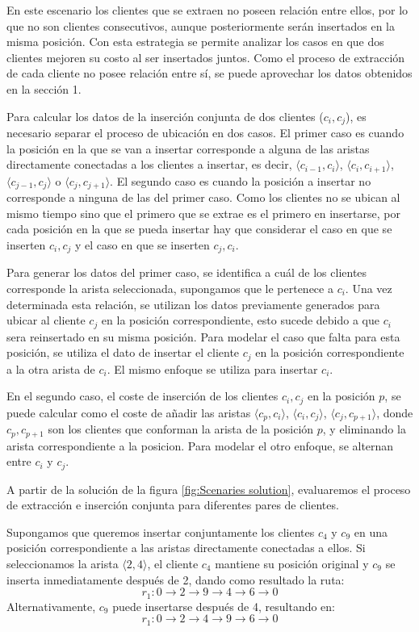 \documentclass{article}
\begin{document}
En este escenario los clientes que se extraen no poseen relación entre ellos, por lo que no son clientes consecutivos, aunque posteriormente serán insertados en la misma posición. Con esta estrategia se permite analizar los casos en que dos clientes mejoren su costo al ser insertados juntos. Como el proceso de extracción de cada cliente no posee relación entre sí, se puede aprovechar los datos obtenidos en la sección 1.

Para calcular los datos de la inserción conjunta de dos clientes ($c_i,c_j$), es necesario separar el proceso de ubicación en dos casos. El primer caso es cuando la posición en la que se van a insertar corresponde a alguna de las aristas directamente conectadas a los clientes a insertar, es decir, $\langle c_{i-1}, c_i \rangle$, $\langle c_i, c_{i+1} \rangle$, $\langle c_{j-1}, c_j \rangle$ o $\langle c_j, c_{j+1} \rangle$. El segundo caso es cuando la posición a insertar no corresponde a ninguna de las del primer caso. Como los clientes no se ubican al mismo tiempo sino que el primero que se extrae es el primero en insertarse, por cada posición en la que se pueda insertar hay que considerar el caso en que se inserten $c_i,c_j$ y el caso en que se inserten $c_j,c_i$. 

Para generar los datos del primer caso, se identifica a cuál de los clientes corresponde la arista seleccionada, supongamos que le pertenece a $c_i$. Una vez determinada esta relación, se utilizan los datos previamente generados para ubicar al cliente $c_j$ en la posición correspondiente, esto sucede debido a que $c_i$ sera reinsertado en su misma posición. Para modelar el caso que falta para esta posición, se utiliza el dato de insertar el cliente $c_j$ en la posición correspondiente a la otra arista de $c_i$. El mismo enfoque se utiliza para insertar $c_i$.

En el segundo caso, el coste de inserción de los clientes $c_i,c_j$ en la posición $p$, se puede calcular como el coste de añadir las aristas $\langle c_p,c_i \rangle$, $\langle c_i,c_j \rangle$, $\langle c_j,c_{p+1} \rangle$, donde $c_p,c_{p+1}$ son los clientes que conforman la arista de la posición $p$, y eliminando la arista correspondiente a la posicion. Para modelar el otro enfoque, se alternan entre $c_i$ y $c_j$.

A partir de la solución de la figura \ref{fig:Scenaries solution}, evaluaremos el proceso de extracción e inserción conjunta para diferentes pares de clientes.  

Supongamos que queremos insertar conjuntamente los clientes  $c_4$ y $c_9$ en una posición correspondiente a las aristas directamente conectadas a ellos. Si seleccionamos la arista $\langle 2, 4 \rangle$, el cliente $c_4$ mantiene su posición original y $c_9$ se inserta inmediatamente después de 2, dando como resultado la ruta:  
\[
r_1: 0 \rightarrow 2 \rightarrow 9 \rightarrow 4 \rightarrow 6 \rightarrow 0
\]  
Alternativamente, $ c_9 $ puede insertarse después de  4, resultando en:  
\[
r_1: 0 \rightarrow 2 \rightarrow 4 \rightarrow 9 \rightarrow 6 \rightarrow 0
\]  
\end{document}

